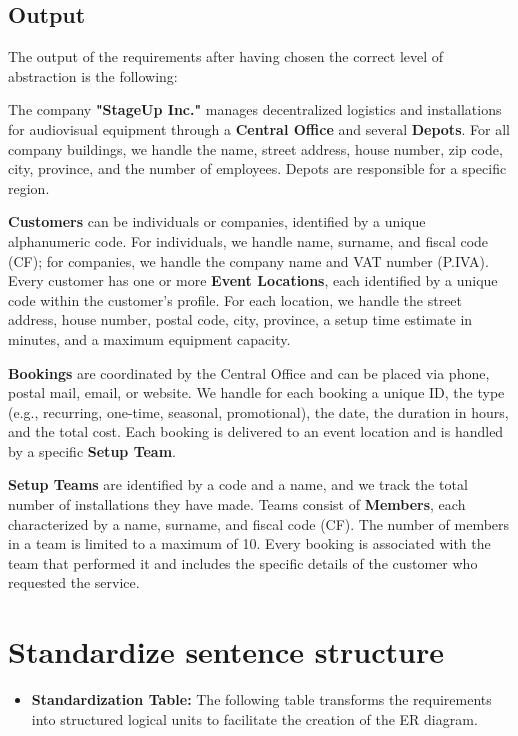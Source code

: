 \documentclass[12pt,a4paper]{article}
\begin{document}
\subsection{Output}
The output of the requirements after having chosen the correct level of abstraction is the following:

The company \textbf{"StageUp Inc."} manages decentralized logistics and installations for audiovisual equipment through a \textbf{Central Office} and several \textbf{Depots}. For all company buildings, we handle the name, street address, house number, zip code, city, province, and the number of employees. Depots are responsible for a specific region. 

\textbf{Customers} can be individuals or companies, identified by a unique alphanumeric code. For individuals, we handle name, surname, and fiscal code (CF); for companies, we handle the company name and VAT number (P.IVA). Every customer has one or more \textbf{Event Locations}, each identified by a unique code within the customer's profile. For each location, we handle the street address, house number, postal code, city, province, a setup time estimate in minutes, and a maximum equipment capacity.

\textbf{Bookings} are coordinated by the Central Office and can be placed via phone, postal mail, email, or website. We handle for each booking a unique ID, the type (e.g., recurring, one-time, seasonal, promotional), the date, the duration in hours, and the total cost. Each booking is delivered to an event location and is handled by a specific \textbf{Setup Team}. 

\textbf{Setup Teams} are identified by a code and a name, and we track the total number of installations they have made. Teams consist of \textbf{Members}, each characterized by a name, surname, and fiscal code (CF). The number of members in a team is limited to a maximum of 10. Every booking is associated with the team that performed it and includes the specific details of the customer who requested the service.

\section{Standardize sentence structure}

\begin{itemize}
    \item \textbf{Standardization Table:} The following table transforms the requirements into structured logical units to facilitate the creation of the ER diagram.
\end{itemize}
\end{document}
